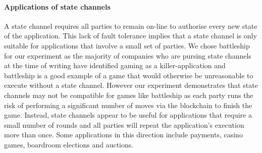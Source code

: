\documentclass{llncs}
\begin{document}
\paragraph{Applications of state channels} 
A state channel requires all parties to remain on-line to authorise every new state of the application.
This lack of fault tolerance implies that a state channel is only suitable for applications that involve a small set of parties. 
We chose battleship for our experiment as the majority of companies who are pursing state channels at the time of writing have identified gaming as a killer-application and battleship is a good example of a game that would otherwise be unreasonable to execute without a state channel. 
However our experiment demonstrates that state channels may not be compatible for games like battleship as each party runs the risk of performing a significant number of moves via the blockchain to finish the game. 
Instead, state channels appear to be  useful for applications that require a small number of rounds and all parties will repeat the application's execution more than once. 
Some applications in this direction include payments, casino games, boardroom elections and auctions.

\newpage 
\appendix
\end{document}
